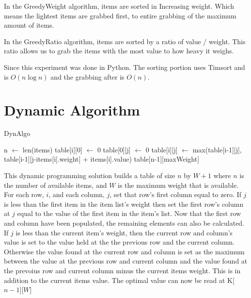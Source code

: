 \documentclass[10pt, letterpaper]{article}
\begin{document}
In the GreedyWeight algorithm, items are sorted in Increasing weight. Which means the lightest items are grabbed first, to entire grabbing of the maximum amount of items.

In the GreedyRatio algorithm, items are sorted by a ratio of value / weight. This ratio allows us to grab the items with the most value to how heavy it weighs.

Since this experiment was done in Python. The sorting portion uses Timsort and is $O(n \log n)$ and the grabbing after is $O(n)$.

\section{Dynamic Algorithm}
\begin{algorithm}[!htpf]
  \begin{algorithmic}
    \caption{DynAlgo}\label{DynAlgo}
    \State n $\gets$ len(items)
    \State table[i][0] $\gets$ 0
    \State table[0][j] $\gets$ 0
    \EndIf
    \State table[i][j] $\gets$ max(table[i-1][j], table[i-1][j-items[i].weight] + items[i].value)
    \EndIf
    \EndFor
    \EndFor
    \Return table[n-1][maxWeight]
    \EndFunction
  \end{algorithmic}
\end{algorithm}

This dynamic programming solution builds a table of size $n$ by $W+1$ where $n$ is the number of available items, and $W$ is the maximum weight that is available. For each row, $i$, and each column, $j$,  set that row's first column equal to zero. If $j$ is less than the first item in the item list's weight then set the first row's column at $j$ equal to the value of the first item in the item's list.
Now that the first row and column have been populated, the remaining elements can also be calculated.
If $j$ is less than the current item's weight, then the current row and column's value is set to the value held at the the previous row and the current column. Otherwise the value found at the current row and column is set as the maximum between the value at the previous row and current column and the value found at the prevoius row and current column minus the current items weight. This is in addition to the current items value. The optimal value can now be read at K[$n-1$][$W$]
\end{document}

